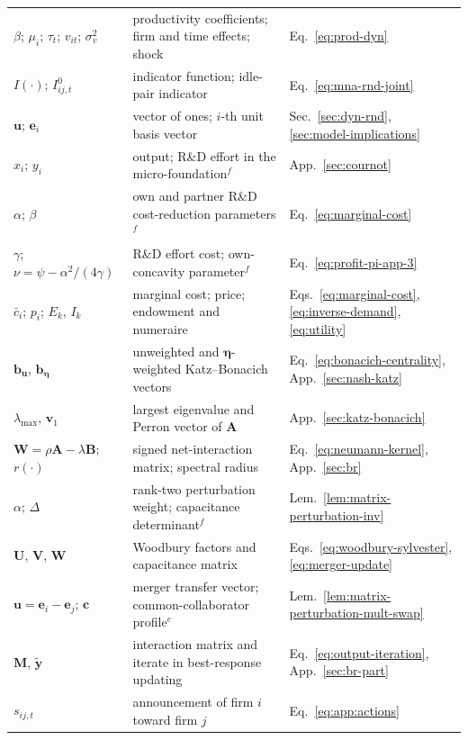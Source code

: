 \begin{table}[htbp]
{\begin{threeparttable}
{\begin{tabular}{@{} l l l @{}}
$\beta$; $\mu_i$; $\tau_t$; $v_{it}$; $\sigma^2_v$ & productivity coefficients; firm and time effects; shock & Eq.~\eqref{eq:prod-dyn} \\
$I(\cdot)$; $I^{0}_{ij,t}$ & indicator function; idle-pair indicator & Eq.~\eqref{eq:mna-rnd-joint} \\
$\mathbf{u}$; $\mathbf{e}_i$ & vector of ones; $i$-th unit basis vector & Sec.~\ref{sec:dyn-rnd}, \ref{sec:model-implications} \\
$x_i$; $y_i$ & output; R\&D effort in the micro-foundation$^{f}$ & App.~\ref{sec:cournot} \\
$\alpha$; $\beta$ & own and partner R\&D cost-reduction parameters$^{f}$ & Eq.~\eqref{eq:marginal-cost} \\
$\gamma$; $\nu=\psi-\alpha^2/(4\gamma)$ & R\&D effort cost; own-concavity parameter$^{f}$ & Eq.~\eqref{eq:profit-pi-app-3} \\
$\bar c_i$; $p_i$; $E_k$, $I_k$ & marginal cost; price; endowment and numeraire & Eqs.~\eqref{eq:marginal-cost}, \eqref{eq:inverse-demand}, \eqref{eq:utility} \\
$\mathbf{b}_{\mathbf{u}}$, $\mathbf{b}_{\bm{\eta}}$ & unweighted and $\bm{\eta}$-weighted Katz--Bonacich vectors & Eq.~\eqref{eq:bonacich-centrality}, App.~\ref{sec:nash-katz} \\
$\lambda_{\max}$, $\mathbf{v}_1$ & largest eigenvalue and Perron vector of $\mathbf{A}$ & App.~\ref{sec:katz-bonacich} \\
$\mathbf{W}=\rho\mathbf{A}-\lambda\mathbf{B}$; $r(\cdot)$ & signed net-interaction matrix; spectral radius & Eq.~\eqref{eq:neumann-kernel}, App.~\ref{sec:br} \\
$\alpha$; $\Delta$ & rank-two perturbation weight; capacitance determinant$^{f}$ & Lem.~\ref{lem:matrix-perturbation-inv} \\
$\mathbf{U}$, $\mathbf{V}$, $\mathbf{W}$ & Woodbury factors and capacitance matrix & Eqs.~\eqref{eq:woodbury-sylvester}, \eqref{eq:merger-update} \\
$\mathbf{u}=\mathbf{e}_i-\mathbf{e}_j$; $\mathbf{c}$ & merger transfer vector; common-collaborator profile$^{e}$ & Lem.~\ref{lem:matrix-perturbation-mult-swap} \\
$\mathbf{M}$, $\widetilde{\mathbf{y}}$ & interaction matrix and iterate in best-response updating & Eq.~\eqref{eq:output-iteration}, App.~\ref{sec:br-part} \\
$s_{ij,t}$ & announcement of firm $i$ toward firm $j$ & Eq.~\eqref{eq:app:actions} \\

\end{tabular}}
\end{threeparttable}}
\end{table}
